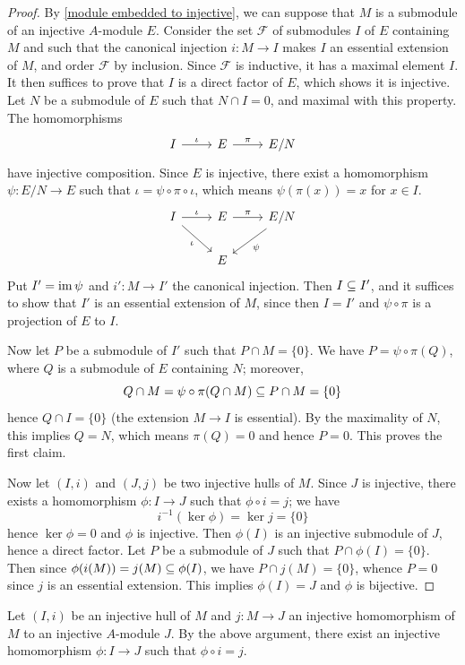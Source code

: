 \begin{proof}
By \cref{module embedded to injective}, we can suppose that $M$ is a submodule of an injective $A$-module $E$. Consider the set $\mathscr{F}$ of submodules $I$ of $E$ containing $M$ and such that the canonical injection $i:M\to I$ makes $I$ an essential extension of $M$, and order $\mathscr{F}$ by inclusion. Since $\mathscr{F}$ is inductive, it has a maximal element $I$. It then suffices to prove that $I$ is a direct factor of $E$, which shows it is injective. Let $N$ be a submodule of $E$ such that $N\cap I=0$, and maximal with this property. The homomorphisms
\[\begin{tikzcd}
I\ar[r,"\iota"]&E\ar[r,"\pi"]&E/N
\end{tikzcd}\]
have injective composition. Since $E$ is injective, there exist a homomorphism $\psi:E/N\to E$ such that $\iota=\psi\circ\pi\circ\iota$, which means $\psi(\pi(x))=x$ for $x\in I$. 
\[\begin{tikzcd}
I\ar[rd,swap,"\iota"]\ar[r,"\iota"]&E\ar[r,"\pi"]&E/N\ar[ld,"\psi"]\\
&E&
\end{tikzcd}\]
Put $I'=\operatorname{im}\psi$ and $i':M\to I'$ the canonical injection. Then $I\subseteq I'$, and it suffices to show that $I'$ is an essential extension of $M$, since then $I=I'$ and $\psi\circ\pi$ is a projection of $E$ to $I$.\par
Now let $P$ be a submodule of $I'$ such that $P\cap M=\{0\}$. We have $P=\psi\circ\pi(Q)$, where $Q$ is a submodule of $E$ containing $N$; moreover,
\[Q\cap M=\psi\circ\pi(Q\cap M)\subseteq P\cap M=\{0\}\]
hence $Q\cap I=\{0\}$ (the extension $M\to I$ is essential). By the maximality of $N$, this implies $Q=N$, which means $\pi(Q)=0$ and hence $P=0$. This proves the first claim.\par
Now let $(I,i)$ and $(J,j)$ be two injective hulls of $M$. Since $J$ is injective, there exists a homomorphism $\phi:I\to J$ such that $\phi\circ i=j$; we have
\[i^{-1}(\ker\phi)=\ker j=\{0\}\]
hence $\ker\phi=0$ and $\phi$ is injective. Then $\phi(I)$ is an injective submodule of $J$, hence a direct factor. Let $P$ be a submodule of $J$ such that $P\cap\phi(I)=\{0\}$. Then since $\phi(i(M))=j(M)\subseteq\phi(I)$, we have $P\cap j(M)=\{0\}$, whence $P=0$ since $j$ is an essential extension. This implies $\phi(I)=J$ and $\phi$ is bijective. 
\end{proof}
\begin{remark}\label{module injective hull smallese injective embedd}
Let $(I,i)$ be an injective hull of $M$ and $j:M\to J$ an injective homomorphism of $M$ to an injective $A$-module $J$. By the above argument, there exist an injective homomorphism $\phi:I\to J$ such that $\phi\circ i=j$.
\end{remark}
